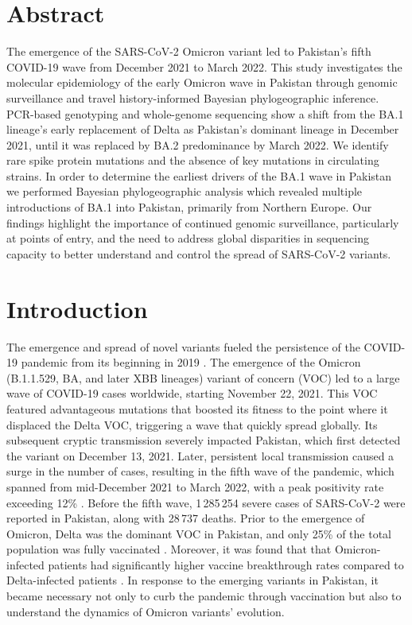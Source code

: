 \section{Abstract}
The emergence of the SARS-CoV-2 Omicron variant led to Pakistan's fifth COVID-19 wave from December 2021 to March 2022.
This study investigates the molecular epidemiology of the early Omicron wave in Pakistan through genomic surveillance and travel history-informed Bayesian phylogeographic inference.
PCR-based genotyping and whole-genome sequencing show a shift from the BA.1 lineage's early replacement of Delta as Pakistan's dominant lineage in December 2021, until it was replaced by BA.2 predominance by March 2022.
We identify rare spike protein mutations and the absence of key mutations in circulating strains.
In order to determine the earliest drivers of the BA.1 wave in Pakistan we performed Bayesian phylogeographic analysis which revealed multiple introductions of BA.1 into Pakistan, primarily from Northern Europe.
Our findings highlight the importance of continued genomic surveillance, particularly at points of entry, and the need to address global disparities in sequencing capacity to better understand and control the spread of SARS-CoV-2 variants.


\section{Introduction}
The emergence and spread of novel variants fueled the persistence of the COVID-19 pandemic from its beginning in 2019 \cite{harvey2021sars, tao2021biological}.
The emergence of the Omicron (B.1.1.529, BA, and later XBB lineages) variant of concern (VOC) led to a large wave of COVID-19 cases worldwide, starting November 22, 2021.
This VOC featured advantageous mutations that boosted its fitness \cite{dhawan2022Omicron, francisco2022emergence} to the point where it displaced the Delta VOC, triggering a wave that quickly spread globally.
Its subsequent cryptic transmission severely impacted Pakistan, which first detected the variant on December 13, 2021.
Later, persistent local transmission caused a surge in the number of cases, resulting in the fifth wave of the pandemic, which spanned from mid-December 2021 to March 2022, with a peak positivity rate exceeding 12\% \cite{ourworldindataPK}.
Before the fifth wave, 1\,285\,254 severe cases of SARS-CoV-2 were reported in Pakistan, along with 28\,737 deaths.
Prior to the emergence of Omicron, Delta was the dominant VOC in Pakistan, and only 25\% of the total population was fully vaccinated \cite{covid-pakistan-stats}.
Moreover, it was found that that Omicron-infected patients had significantly higher vaccine breakthrough rates compared to Delta-infected patients \cite{christensen2022signals}.
In response to the emerging variants in Pakistan, it became necessary not only to curb the pandemic through vaccination but also to understand the dynamics of Omicron variants' evolution.

